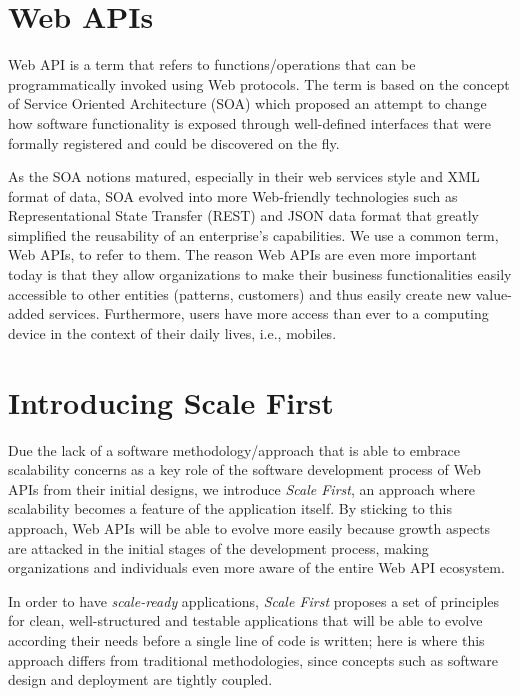\documentclass[10pt,article]{IEEEtran}
\begin{document}

\section{Web APIs}
Web API is a term that refers to functions/operations that can be programmatically invoked using Web protocols. The term is based on the concept of Service Oriented Architecture (SOA) which proposed an attempt to change how software functionality is exposed through well-defined interfaces that were formally registered and could be discovered on the fly.

As the SOA notions matured, especially in their web services style and XML format of data, SOA evolved into more Web-friendly technologies such as Representational State Transfer (REST) and JSON data format that greatly simplified the reusability of an enterprise's capabilities. We use a common term, Web APIs, to refer to them. The reason Web APIs are even more important today is that they allow organizations to make their business functionalities easily accessible  to  other  entities  (patterns,  customers)  and  thus  easily create new value-added services. Furthermore, users have more access than ever to a computing  device  in  the  context  of  their  daily  lives, i.e., mobiles.\cite{webapi:definition}

\section{Introducing Scale First}
Due the lack of a software methodology/approach that is able to embrace scalability concerns as a key role of the software development process of Web APIs from their initial designs, we introduce \textit{Scale First}, an approach where scalability becomes a feature of the application itself. By sticking to this approach, Web APIs will be able to evolve more easily because growth aspects are attacked in the initial stages of the development process, making organizations and individuals even more aware of the entire Web API ecosystem.

In order to have \textit{scale-ready} applications, \textit{Scale First} proposes a set of principles for clean, well-structured and testable applications that will be able to evolve according their needs before a single line of code is written; here is where this approach differs from traditional methodologies, since concepts such as software design and deployment are tightly coupled. 
\end{document}
